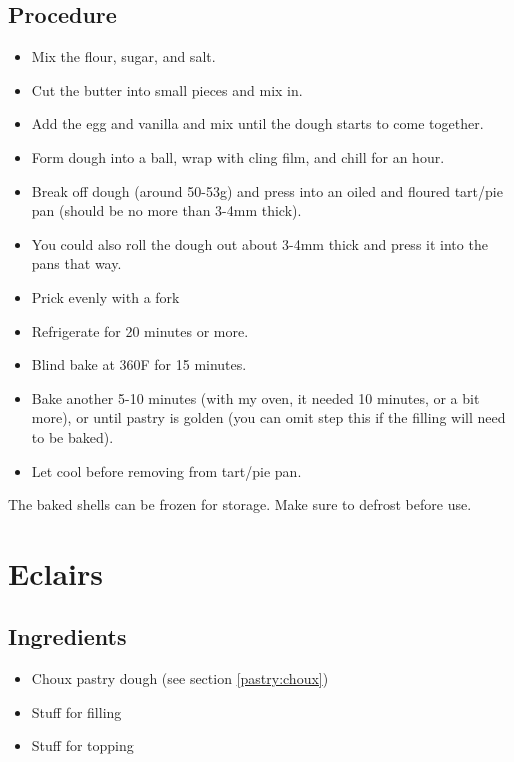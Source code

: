 \documentclass[10pt, openany]{book}
\begin{document}
\subsection{Procedure}
\begin{itemize}
  \item Mix the flour, sugar, and salt.
  \item Cut the butter into small pieces and mix in.
  \item Add the egg and vanilla and mix until the dough starts to come together.
  \item Form dough into a ball, wrap with cling film, and chill for an hour.
  \item Break off dough (around 50-53g) and press into an oiled and floured tart/pie pan (should be no more than 3-4mm thick).
  \item You could also roll the dough out about 3-4mm thick and press it into the pans that way.
  \item Prick evenly with a fork
  \item Refrigerate for 20 minutes or more.
  \item Blind bake at 360\degree{}F for 15 minutes.
  \item Bake another 5-10 minutes (with my oven, it needed 10 minutes, or a bit more), or until pastry is golden (you can omit step this if the filling will need to be baked).
  \item Let cool before removing from tart/pie pan.
\end{itemize}
The baked shells can be frozen for storage.  Make sure to defrost before use.

\section{Eclairs}
\label{pastry:Eclair}
\subsection{Ingredients}
\begin{itemize}
  \item Choux pastry dough (see section \ref{pastry:choux})
  \item Stuff for filling
  \item Stuff for topping
\end{itemize}
\end{document}
